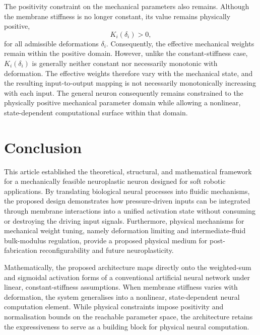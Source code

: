\documentclass[11pt,a4paper]{article}
\numberwithin{equation}{section}
\begin{document}
The positivity constraint on the mechanical parameters also remains. Although the membrane stiffness is no longer
constant, its value remains physically positive,
\begin{equation*}
  K_i(\delta_i) > 0,
\end{equation*}
for all admissible deformations $\delta_i$. Consequently, the effective mechanical weights remain within the
positive domain. However, unlike the constant-stiffness case, $K_i(\delta_i)$ is generally neither constant nor
necessarily monotonic with deformation. The effective weights therefore vary with the mechanical state, and the
resulting input-to-output mapping is not necessarily monotonically increasing with each input. The general neuron
consequently remains constrained to the physically positive mechanical parameter domain while allowing a nonlinear,
state-dependent computational surface within that domain.

\section{Conclusion}

This article established the theoretical, structural, and mathematical framework for a mechanically feasible
neuroplastic neuron designed for soft robotic applications. By translating biological neural processes into fluidic
mechanisms, the proposed design demonstrates how pressure-driven inputs can be integrated through membrane
interactions into a unified activation state without consuming or destroying the driving input signals.
Furthermore, physical mechanisms for mechanical weight tuning, namely deformation limiting and intermediate-fluid
bulk-modulus regulation, provide a proposed physical medium for post-fabrication reconfigurability and future
neuroplasticity.

Mathematically, the proposed architecture maps directly onto the weighted-sum and sigmoidal activation forms of a
conventional artificial neural network under linear, constant-stiffness assumptions. When membrane stiffness varies
with deformation, the system generalises into a nonlinear, state-dependent neural computation element. While
physical constraints impose positivity and normalisation bounds on the reachable parameter space, the architecture
retains the expressiveness to serve as a building block for physical neural computation.
\end{document}

